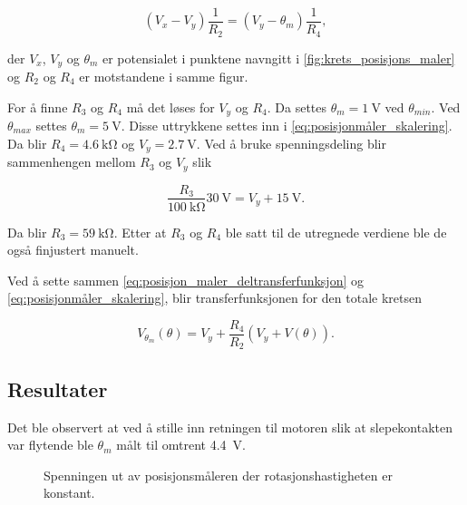\begin{equation}
    \label{eq:posisjonmåler_skalering}
    (V_x - V_y) \frac{1}{R_2} = (V_y - \theta_m) \frac{1}{R_4},
\end{equation}

der $V_x$, $V_y$ og $\theta_m$ er potensialet i punktene navngitt i \autoref{fig:krets_posisjons_maler} og $R_2$ og $R_4$ er motstandene i samme figur.

For å finne $R_3$ og $R_4$ må det løses for $V_y$ og $R_4$.
Da settes $\theta_m = \SI{1}{\volt}$ ved $\theta_{min}$.
Ved $\theta_{max}$ settes $\theta_m = \SI{5}{\volt}$.
Disse uttrykkene settes inn i \eqref{eq:posisjonmåler_skalering}. 
Da blir $R_4 = \SI{4.6}{\kilo\ohm}$ og 
$V_y = \SI{2.7}{\volt}$.
Ved å bruke spenningsdeling blir sammenhengen mellom $R_3$ og $V_y$ slik

\begin{equation}
    \label{eq:posisjon_maler_R3}
    \frac{R_3}{\SI{100}{\kilo\ohm}} \SI{30}{\volt} = V_y + \SI{15}{\volt}.
\end{equation}

Da blir $R_3 = \SI{59}{\kilo\ohm}$. Etter at $R_3$ og $R_4$ ble satt til de utregnede verdiene ble de også finjustert manuelt.

Ved å sette sammen \eqref{eq:posisjon_maler_deltransferfunksjon} og \eqref{eq:posisjonmåler_skalering}, blir transferfunksjonen for den totale kretsen

\begin{equation}
    \label{eq:posisjon_maling_transferfuksjon}
    V_{\theta_m}(\theta) = V_y + \frac{R_4}{R_2}(V_y + V(\theta)).
\end{equation}






\subsection{Resultater}

\label{obs:floating_potensiometer}
Det ble observert at ved å stille inn retningen til motoren slik at slepekontakten var flytende ble $\theta_m$ målt til omtrent \SI{4.4}{\volt}.

\begin{figure}[h]
    \centering
    
    \caption{Spenningen ut av posisjonsmåleren der rotasjonshastigheten er konstant.}
    \label{fig:posisjon_sagtann}
\end{figure}






